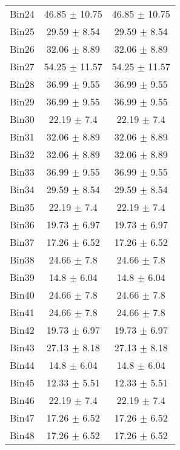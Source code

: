 \begin{tabular}{|c|c|c|}
     Bin24 & 46.85 $\pm$ 10.75 & 46.85 $\pm$ 10.75 \\ \cline{1-3} 
     Bin25 & 29.59 $\pm$ 8.54 & 29.59 $\pm$ 8.54 \\ \cline{1-3} 
     Bin26 & 32.06 $\pm$ 8.89 & 32.06 $\pm$ 8.89 \\ \cline{1-3} 
     Bin27 & 54.25 $\pm$ 11.57 & 54.25 $\pm$ 11.57 \\ \cline{1-3} 
     Bin28 & 36.99 $\pm$ 9.55 & 36.99 $\pm$ 9.55 \\ \cline{1-3} 
     Bin29 & 36.99 $\pm$ 9.55 & 36.99 $\pm$ 9.55 \\ \cline{1-3} 
     Bin30 & 22.19 $\pm$ 7.4 & 22.19 $\pm$ 7.4 \\ \cline{1-3} 
     Bin31 & 32.06 $\pm$ 8.89 & 32.06 $\pm$ 8.89 \\ \cline{1-3} 
     Bin32 & 32.06 $\pm$ 8.89 & 32.06 $\pm$ 8.89 \\ \cline{1-3} 
     Bin33 & 36.99 $\pm$ 9.55 & 36.99 $\pm$ 9.55 \\ \cline{1-3} 
     Bin34 & 29.59 $\pm$ 8.54 & 29.59 $\pm$ 8.54 \\ \cline{1-3} 
     Bin35 & 22.19 $\pm$ 7.4 & 22.19 $\pm$ 7.4 \\ \cline{1-3} 
     Bin36 & 19.73 $\pm$ 6.97 & 19.73 $\pm$ 6.97 \\ \cline{1-3} 
     Bin37 & 17.26 $\pm$ 6.52 & 17.26 $\pm$ 6.52 \\ \cline{1-3} 
     Bin38 & 24.66 $\pm$ 7.8 & 24.66 $\pm$ 7.8 \\ \cline{1-3} 
     Bin39 & 14.8 $\pm$ 6.04 & 14.8 $\pm$ 6.04 \\ \cline{1-3} 
     Bin40 & 24.66 $\pm$ 7.8 & 24.66 $\pm$ 7.8 \\ \cline{1-3} 
     Bin41 & 24.66 $\pm$ 7.8 & 24.66 $\pm$ 7.8 \\ \cline{1-3} 
     Bin42 & 19.73 $\pm$ 6.97 & 19.73 $\pm$ 6.97 \\ \cline{1-3} 
     Bin43 & 27.13 $\pm$ 8.18 & 27.13 $\pm$ 8.18 \\ \cline{1-3} 
     Bin44 & 14.8 $\pm$ 6.04 & 14.8 $\pm$ 6.04 \\ \cline{1-3} 
     Bin45 & 12.33 $\pm$ 5.51 & 12.33 $\pm$ 5.51 \\ \cline{1-3} 
     Bin46 & 22.19 $\pm$ 7.4 & 22.19 $\pm$ 7.4 \\ \cline{1-3} 
     Bin47 & 17.26 $\pm$ 6.52 & 17.26 $\pm$ 6.52 \\ \cline{1-3} 
     Bin48 & 17.26 $\pm$ 6.52 & 17.26 $\pm$ 6.52 \\ \cline{1-3} 

\end{tabular}

